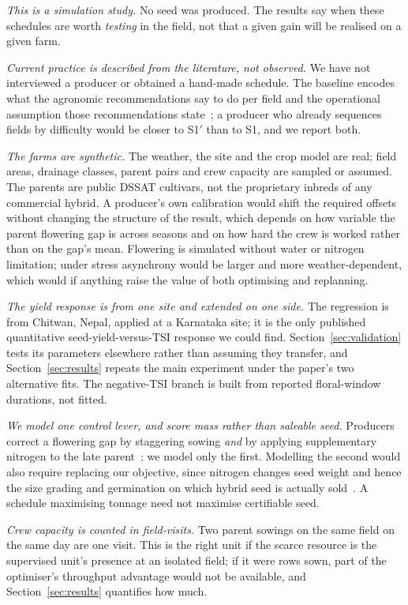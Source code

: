 \documentclass[10pt,twocolumn]{article}
\begin{document}
\emph{This is a simulation study.} No seed was produced. The results say
when these schedules are worth \emph{testing} in the field, not that a given
gain will be realised on a given farm.

\emph{Current practice is described from the literature, not observed.}
We have not interviewed a producer or obtained a hand-made schedule. The
baseline encodes what the agronomic recommendations say to do per field and
the operational assumption those recommendations state~\cite{chassaigne2021};
a producer who already sequences fields by difficulty would be closer to
S1$'$ than to S1, and we report both.

\emph{The farms are synthetic.} The weather, the site and the crop model are
real; field areas, drainage classes, parent pairs and crew capacity are
sampled or assumed. The parents are public DSSAT cultivars, not the
proprietary inbreds of any commercial hybrid. A producer's own calibration
would shift the required offsets without changing the structure of the
result, which depends on how variable the parent flowering gap is across
seasons and on how hard the crew is worked rather than on the gap's mean.
Flowering is simulated without water or nitrogen limitation; under stress
asynchrony would be larger and more weather-dependent, which would if
anything raise the value of both optimising and replanning.

\emph{The yield response is from one site and extended on one side.} The
regression is from Chitwan, Nepal, applied at a Karnataka site; it is the
only published quantitative seed-yield-versus-TSI response we could find.
Section~\ref{sec:validation} tests its parameters elsewhere rather than
assuming they transfer, and Section~\ref{sec:results} repeats the main
experiment under the paper's two alternative fits. The negative-TSI branch
is built from reported floral-window durations, not fitted.

\emph{We model one control lever, and score mass rather than saleable seed.}
Producers correct a flowering gap by staggering sowing \emph{and} by applying
supplementary nitrogen to the late parent~\cite{priyanka2017,patil2026,%
asefa2024}; we model only the first. Modelling the second would also require
replacing our objective, since nitrogen changes seed weight and hence the
size grading and germination on which hybrid seed is actually
sold~\cite{marahatta2025}. A schedule maximising tonnage need not maximise
certifiable seed.

\emph{Crew capacity is counted in field-visits.} Two parent sowings on the
same field on the same day are one visit. This is the right unit if the
scarce resource is the supervised unit's presence at an isolated field; if
it were rows sown, part of the optimiser's throughput advantage would not
be available, and Section~\ref{sec:results} quantifies how much.
\end{document}

